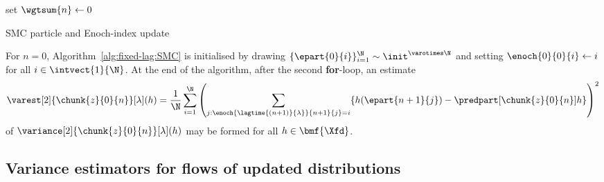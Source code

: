 \bigskip
\begin{algorithm}[H] \label{alg:fixed-lag:SMC}
    set $\wgtsum{n} \gets 0$\;
    \caption{SMC particle and Enoch-index update}
\end{algorithm}
\bigskip

For $n = 0$, Algorithm~\ref{alg:fixed-lag:SMC} is initialised by drawing $\{ \epart{0}{i} \}_{i = 1}^\N \sim \init^{\varotimes \N}$ and setting $\enoch{0}{0}{i} \gets i$ for all $i \in \intvect{1}{\N}$. At the end of the algorithm, after the second \textbf{for}-loop, an estimate 
$$
    \varest[2]{\chunk{z}{0}{n}}[\lambda](h) = \frac{1}{\N} \sum_{i = 1}^\N \left( \sum_{j : \enoch{\lagtime{(n + 1)}{\lambda}}{n + 1}{j} = i} \{ h(\epart{n + 1}{j}) - \predpart[\chunk{z}{0}{n}] h \} \right)^2
$$
of $\variance[2]{\chunk{z}{0}{n}}[\lambda](h)$ may be formed for all $h \in \bmf{\Xfd}$. 

\subsection{Variance estimators for flows of updated distributions}
\label{sec:updated:measures}

